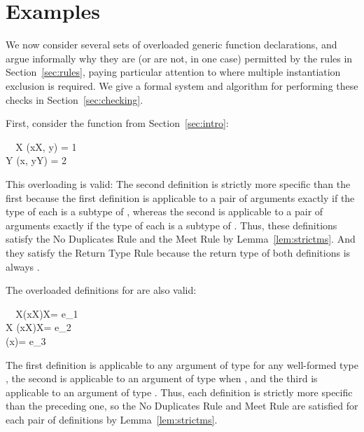 \documentclass[10pt]{sigplanconf}
\begin{document}
\section{Examples}
\label{sec:examples}
We now consider several sets of overloaded generic function declarations, 
and argue informally why they are 
(or are not, in one case) 
permitted by the rules in Section~\ref{sec:rules}, 
paying particular attention to where multiple instantiation exclusion is required.
We give a formal system and algorithm for performing these checks 
in Section~\ref{sec:checking}.

First, consider the function 
from Section~\ref{sec:intro}:

\small
\begin{FortressCode}
{\tt ~~}\+\llbracket{}X \SHORTCUT{<} \rrbracket(x\COLON X, y\COLON {})\COLON {} = 1 \\
  \llbracket{}Y \SHORTCUT{<} \rrbracket(x\COLON {}, y\COLON Y)\COLON {} = 2\-
\end{FortressCode}
\normalsize
This overloading is valid: 
The second definition is strictly more specific than the first 
because the first definition is applicable to a pair of arguments 
exactly if the type of each is a subtype of , 
whereas the second is applicable to a pair of arguments exactly if
the type of each is a subtype of .
Thus, these definitions satisfy the No Duplicates Rule 
and the Meet Rule by Lemma~\ref{lem:strictms}.
And they satisfy the Return Type Rule 
because the return type of both definitions is always .

The overloaded definitions for  are also valid:

\small
\begin{FortressCode}
{\tt ~~}\+\llbracket{}X\rrbracket\bigl(x\COLON {}\llbracket{}X\rrbracket\bigr)\COLON {}\llbracket{}X\rrbracket = e_1 \\
  \llbracket{}X \SHORTCUT{<} \rrbracket\bigl(x\COLON {}\llbracket{}X\rrbracket\bigr)\COLON {}\llbracket{}X\rrbracket = e_2 \\
  \bigl(x\COLON {}\llbracket{}\rrbracket\bigr)\COLON {}\llbracket{}\rrbracket = e_3\-
\end{FortressCode}
\normalsize
The first definition is applicable to any argument 
of type  for any well-formed type , 
the second is applicable to an argument 
of type  when , 
and the third is applicable to an argument 
of type .
Thus, 
each definition is strictly more specific than the preceding one, 
so the No Duplicates Rule and Meet Rule 
are satisfied for each pair of definitions by Lemma~\ref{lem:strictms}.
\end{document}
